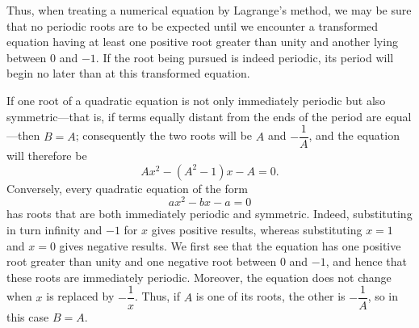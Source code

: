 
Thus, when treating a numerical equation by Lagrange's method, we may be sure
that no periodic roots are to be expected until we encounter a transformed
equation having at least one positive root greater than unity and another
lying between $0$ and $-1$. If the root being pursued is indeed periodic,
its period will begin no later than at this transformed equation.

If one root of a quadratic equation is not only immediately periodic but also
symmetric---that is, if terms equally distant from the ends of the period are
equal---then $B=A$; consequently the two roots
%
will be $A$ and $-\dfrac{1}{A}$, and the equation will therefore be
\[
Ax^{2} - (A^{2}-1)x - A = 0.
\]
Conversely, every quadratic equation of the form
\[
ax^{2} - bx - a = 0
\]
has roots that are both immediately periodic and symmetric. Indeed, substituting
in turn infinity and $-1$ for $x$ gives positive results, whereas substituting
$x=1$ and $x=0$ gives negative results. We first see that the equation has one
positive root greater than unity and one negative root between $0$ and $-1$,
and hence that these roots are immediately periodic. Moreover, the equation
does not change when $x$ is replaced by $-\dfrac{1}{x}$. Thus, if $A$ is one
of its roots, the other is $-\dfrac{1}{A}$, so in this case $B=A$.

